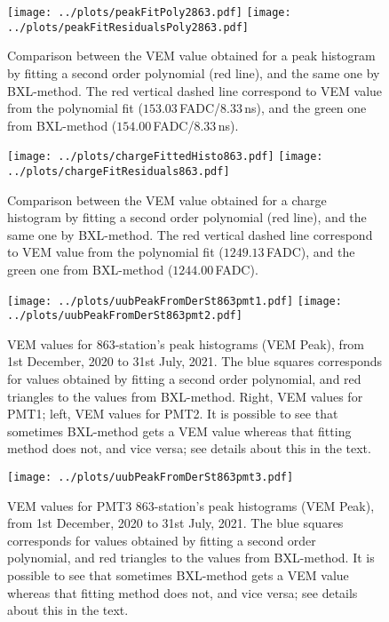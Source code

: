 \documentclass[twoside, final, 10pt]{articleMine}
\begin{document}
\begin{figure}[!tbh]
  \centering
  \subfigure
  {
    \texttt{[image: ../plots/peakFitPoly2863.pdf]}
    \texttt{[image: ../plots/peakFitResidualsPoly2863.pdf]}
  }
  \caption{Comparison between the VEM value obtained for a peak
  histogram by fitting a second order polynomial (red line), and
  the same one by BXL-method. The red vertical dashed line
  correspond to VEM value from the polynomial fit
  ($153.03$\,FADC/$8.33$\,ns), and the green one from BXL-method
  ($154.00$\,FADC/$8.33$\,ns).}
  \label{figPkFitPoly2comparDer}
\end{figure}

\begin{figure}[!tbh]
  \centering
  \subfigure
  {
    \texttt{[image: ../plots/chargeFittedHisto863.pdf]}
    \texttt{[image: ../plots/chargeFitResiduals863.pdf]}
  }
  \caption{Comparison between the VEM value obtained for a charge
  histogram by fitting a second order polynomial (red line), and
  the same one by BXL-method. The red vertical dashed line
  correspond to VEM value from the polynomial fit
  ($1249.13$\,FADC), and the green one from BXL-method
  ($1244.00$\,FADC).}
  \label{figChFitPoly2comparDer}
\end{figure}
\clearpage

\begin{figure}[!tbh]
  \centering
  \subfigure
  {
    \texttt{[image: ../plots/uubPeakFromDerSt863pmt1.pdf]}
    \texttt{[image: ../plots/uubPeakFromDerSt863pmt2.pdf]}
  }
  \caption{VEM values for 863-station's peak histograms (VEM
  Peak), from 1st December, 2020 to 31st July, 2021. The blue
  squares corresponds for values obtained by fitting a second
  order polynomial, and red triangles to the values from
  BXL-method. Right, VEM values for PMT1; left, VEM values for
  PMT2. It is possible to see that sometimes BXL-method gets a
  VEM value whereas that fitting method does not, and vice
  versa; see details about this in the text.}
  \label{figPkVemCompFitDerTimePmt1}
\end{figure}

\begin{figure}[!tbh]
  \centering
  \subfigure
  {
    \texttt{[image: ../plots/uubPeakFromDerSt863pmt3.pdf]}
  }
  \caption{VEM values for PMT3 863-station's peak histograms (VEM
  Peak), from 1st December, 2020 to 31st July, 2021. The blue
  squares corresponds for values obtained by fitting a second
  order polynomial, and red triangles to the values from
  BXL-method. It is possible to see that sometimes BXL-method
  gets a VEM value whereas that fitting method does not, and
  vice versa; see details about this in the text.}
  \label{figPkVemCompFitDerTimePmt3}
\end{figure}
\clearpage
\end{document}
